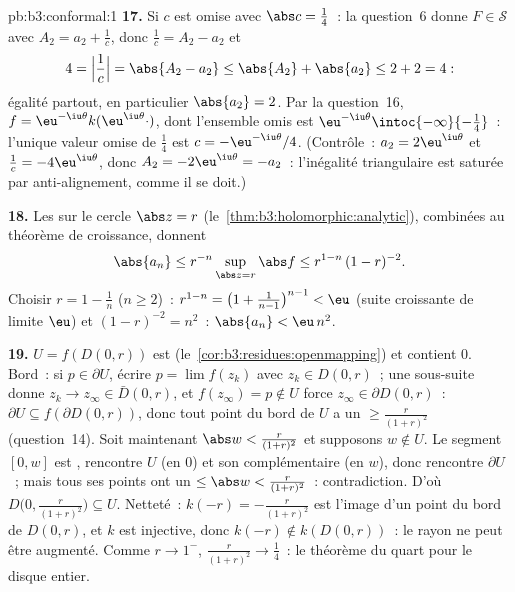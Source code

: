 \begin{solution}{pb:b3:conformal:1}
\textbf{17.} Si $c$ est omise avec $\abs c = \frac14$~: la
question~6 donne $F \in \mathcal S$ avec $A_2 = a_2 +
\frac1c$, donc $\frac1c = A_2 - a_2$ et
\[
4 = \Bigl|\frac1c\Bigr| = \abs{A_2 - a_2}
\leq \abs{A_2} + \abs{a_2} \leq 2 + 2 = 4 :
\]
égalité partout, en particulier $\abs{a_2} = 2$. Par la
question~16, $f = \eu^{-\iu\theta}k(\eu^{\iu\theta}\cdot)$,
dont l'ensemble omis est $\eu^{-\iu\theta}
\intoc{-\infty}{-\frac14}$~: l'unique valeur omise de
 $\frac14$ est $c = -\eu^{-\iu\theta}/4$. (Contrôle~:
$a_2 = 2\eu^{\iu\theta}$ et $\frac1c = -4\eu^{\iu\theta}$,
donc $A_2 = -2\eu^{\iu\theta} = -a_2$~: l'inégalité
triangulaire est saturée par anti-alignement, comme il se
doit.)

\textbf{18.} Les  sur le cercle $\abs z
= r$ (le~\cref{thm:b3:holomorphic:analytic}), combinées au
théorème de croissance, donnent
\[
\abs{a_n} \leq r^{-n}\sup_{\abs z = r}\abs f
\leq r^{1-n}\,(1 - r)^{-2} .
\]
Choisir $r = 1 - \frac1n$ ($n \geq 2$)~: $r^{1-n} =
\bigl(1 + \frac1{n-1}\bigr)^{n-1} < \eu$ (suite croissante
de limite $\eu$) et $(1 - r)^{-2} = n^2$~: $\abs{a_n} <
\eu\,n^2$.

\textbf{19.} $U = f(D(0, r))$ est 
(le~\cref{cor:b3:residues:openmapping}) et contient $0$.
Bord~: si $p \in \partial U$, écrire $p = \lim f(z_k)$ avec
$z_k \in D(0, r)$~; une sous-suite donne $z_k \to z_\infty
\in \bar D(0, r)$, et $f(z_\infty) = p \notin U$ force
$z_\infty \in \partial D(0, r)$~: $\partial U \subseteq
f(\partial D(0, r))$, donc tout point du bord de $U$ a un
 $\geq \frac r{(1+r)^2}$ (question~14). Soit
maintenant $\abs w < \frac r{(1+r)^2}$ et supposons $w
\notin U$. Le segment $[0, w]$ est , rencontre $U$
(en $0$) et son complémentaire (en $w$), donc rencontre
$\partial U$~; mais tous ses points ont un  $\leq \abs
w < \frac r{(1+r)^2}$~: contradiction. D'où $D\bigl(0,
\frac r{(1+r)^2}\bigr) \subseteq U$. Netteté~: $k(-r) =
-\frac r{(1+r)^2}$ est l'image d'un point du bord de
$D(0,r)$, et $k$ est injective, donc $k(-r) \notin k(D(0,
r))$~: le rayon ne peut être augmenté. Comme $r \to 1^-$,
$\frac r{(1+r)^2} \to \frac14$~: le théorème du quart pour
le disque entier.


\end{solution}
